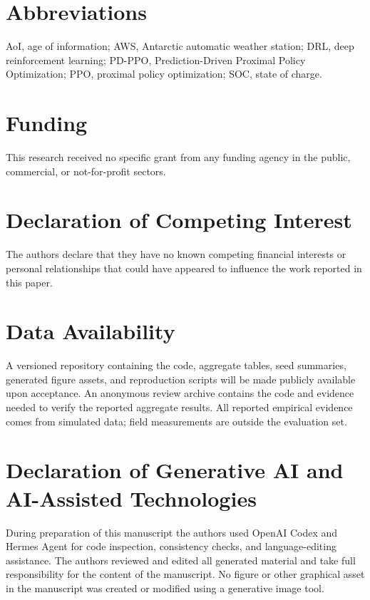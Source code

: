 \documentclass[review,authoryear,12pt]{elsarticle}
\newif\ifanonymoussubmission
\begin{document}
\section*{Abbreviations}
\noindent
AoI, age of information; AWS, Antarctic automatic weather station; DRL, deep
reinforcement learning; PD-PPO, Prediction-Driven Proximal Policy Optimization;
PPO, proximal policy optimization; SOC, state of charge.










\appendix


\ifanonymoussubmission
\else
  
\fi

\section*{Funding}
This research received no specific grant from any funding agency in the public,
commercial, or not-for-profit sectors.

\section*{Declaration of Competing Interest}
The authors declare that they have no known competing financial interests or
personal relationships that could have appeared to influence the work reported in
this paper.

\section*{Data Availability}
A versioned repository containing the code, aggregate tables, seed summaries,
generated figure assets, and reproduction scripts will be made publicly
available upon acceptance. An anonymous review archive contains the code and
evidence needed to verify the reported aggregate results. All reported empirical
evidence comes from simulated data; field measurements are outside the
evaluation set.

\section*{Declaration of Generative AI and AI-Assisted Technologies}
During preparation of this manuscript the authors used OpenAI Codex and Hermes
Agent for code inspection, consistency checks, and language-editing assistance.
The authors reviewed and edited all generated material and take full responsibility for the
content of the manuscript. No figure or other graphical asset in the manuscript
was created or modified using a generative image tool.



\end{document}
